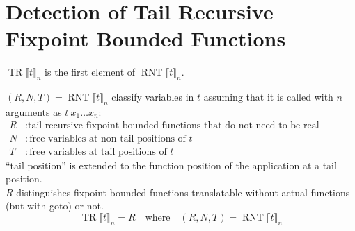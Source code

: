 \documentclass[a4paper,fleqn]{article}
\newcommand{\BRA}[1]{\llbracket #1 \rrbracket}
\DeclareMathOperator{\TRop}{TR}
\newcommand{\TR}[2]{\TRop\BRA{#1}_{#2}}
\DeclareMathOperator{\RNTop}{RNT}
\newcommand{\RNT}[2]{\RNTop\BRA{#1}_{#2}}
\newcommand{\kwgoto}{\mbox{\color{myviolet}\ttfamily goto}}
\begin{document}
\section{Detection of Tail Recursive Fixpoint Bounded Functions}\label{sec:tailrec-fixpoint-detection}
\raggedright
$\TR{t}{n}$ is the first element of $\RNT{t}{n}$.

$(R,N,T) = \RNT{t}{n}$ classify variables in $t$ assuming that it is called with $n$ arguments as $t~x_1\dots x_n$:
\begin{align*}
  R &: \text{tail-recursive fixpoint bounded functions that do not need to be real functions} \\
  N &: \text{free variables at non-tail positions of $t$} \\
  T &: \text{free variables at tail positions of $t$}
\end{align*}
``tail position'' is extended to the function position of the application at a tail position. \\
$R$ distinguishes fixpoint bounded functions translatable without actual functions (but with \kwgoto{}) or not.
\[ \TR{t}{n} = R \quad \text{where}\quad (R,N,T) = \RNT{t}{n} \]
\end{document}
